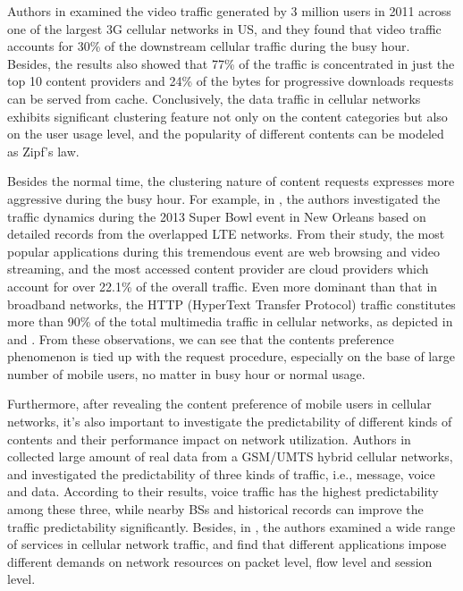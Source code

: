 Authors in \cite{erman2011over} examined the video traffic generated by 3 million users in 2011 across one of the largest 3G cellular networks in US, and they found that video traffic accounts for 30\% of the downstream cellular traffic during the busy hour. Besides, the results also showed that 77\% of the traffic is concentrated in just the top 10 content providers and 24\% of the bytes for progressive downloads requests can be served from cache. Conclusively, the data traffic in cellular networks exhibits significant clustering feature not only on the content categories but also on the user usage level, and the popularity of different contents can be modeled as Zipf's law.

Besides the normal time, the clustering nature of content requests expresses more aggressive during the busy hour. For example, in \cite{erman2013understanding}, the authors investigated the traffic dynamics during the 2013 Super Bowl event in New Orleans based on detailed records from the overlapped LTE networks. From their study, the most popular applications during this tremendous event are web browsing and video streaming, and the most accessed content provider are cloud providers which account for over 22.1\% of the overall traffic. Even more dominant than that in broadband networks, the HTTP (HyperText Transfer Protocol) traffic constitutes more than 90\% of the total multimedia traffic in cellular networks, as depicted in \cite{erman2011over} and \cite{maier2009dominant}. From these observations, we can see that the contents preference phenomenon is tied up with the request procedure, especially on the base of large number of mobile users, no matter in busy hour or normal usage.

Furthermore, after revealing the content preference of mobile users in cellular networks, it's also important to investigate the predictability of different kinds of contents and their performance impact on network utilization. Authors in \cite{zhou2012predictability} collected large amount of real data from a GSM/UMTS hybrid cellular networks, and investigated the predictability of three kinds of traffic, i.e., message, voice and data. According to their results, voice traffic has the highest predictability among these three, while nearby BSs and historical records can improve the traffic predictability significantly. Besides, in \cite{zhang2012understanding}, the authors examined a wide range of services in cellular network traffic, and find that different applications impose different demands on network resources on packet level, flow level and session level.

